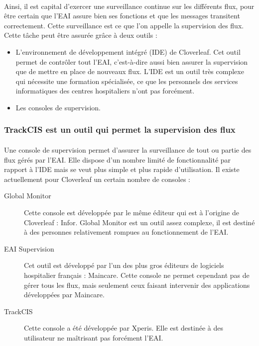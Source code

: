 			\paragraph{}%
			Ainsi, il est capital d'exercer une surveillance continue sur les différents
			flux, pour être certain que l'EAI assure bien ses fonctions et que les
			messages transitent correctement. Cette surveillance est ce que l'on appelle
			la supervision des flux. Cette tâche peut être assurée grâce à deux outils :
			\begin{itemize}
			  \item L'environnement de développement intégré (IDE) de Cloverleaf. Cet
			  outil permet de contrôler tout l'EAI, c'est-à-dire aussi bien assurer la
			  supervision que de mettre en place de nouveaux flux. L'IDE est un outil
			  très complexe qui nécessite une formation spécialisée, ce que les
			  personnels des services informatiques des centres hospitaliers n'ont pas
			  forcément.
			  \item Les consoles de supervision.
			\end{itemize}
			
		\subsubsection{TrackCIS est un outil qui permet la supervision des flux}
			\paragraph{}%
			Une console de supervision permet d'assurer la surveillance
			de tout ou partie des flux gérés par l'EAI. Elle dispose d'un
			nombre limité de fonctionnalité par rapport à l'IDE mais se veut plus simple
			et plus rapide d'utilisation. Il existe actuellement pour Cloverleaf un
			certain nombre de consoles :
			\begin{description}
				\item[Global Monitor] Cette console est développée par le même éditeur qui
				est à l'origine de Cloverleaf : Infor. Global Monitor est un outil assez
				complexe, il est destiné à des personnes relativement rompues au
				fonctionnement de l'EAI.
				\item[EAI Supervision] Cet outil est développé par l'un des plus gros
				éditeurs de logiciels hospitalier français : Maincare. Cette console ne
				permet cependant pas de gérer tous les flux, mais seulement ceux faisant
				intervenir des applications développées par Maincare.
				\item[TrackCIS] Cette console a été développée par Xperis. Elle est destinée
				à des utilisateur ne maîtrisant pas forcément l'EAI.
			\end{description}
			
